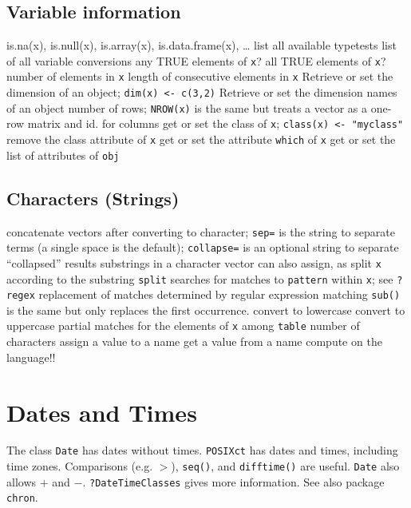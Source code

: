 \subsection{Variable information}{is.na(x), is.null(x), is.array(x), is.data.frame(x), \ldots}
	{list all available typetests}
	{list of all variable conversions}
	{any TRUE elements of {\tt x}?}
	{all TRUE elements of {\tt x}?}
	{ number of elements in {\tt x}}
	{length of consecutive elements in {\tt x}}
	{Retrieve or set the dimension of an object; {\tt dim(x) <- c(3,2)}}
	{Retrieve or set the dimension names of an object}
	{number of rows; {\tt NROW(x)} is the same but treats a vector as a one-row matrix}
	{and}
	{id. for columns}
	{get or set the class of {\tt x}; {\tt class(x) <- "myclass"}}
	{remove the class attribute of {\tt x}}
	{get or set the attribute {\tt which} of {\tt x}}
	{get or set the list of attributes of {\tt obj}}

\subsection{Characters (Strings)}{}
	{concatenate vectors after converting to character; {\tt sep=} is the string to separate terms (a single space is the default); {\tt collapse=} is an optional string to separate ``collapsed'' results}
	{substrings in a character vector}
	{can also assign, as}
	{split {\tt x} according to the substring {\tt split}}
	{searches for matches to {\tt pattern} within {\tt x}; see {\tt ?regex}}
	{replacement of matches determined by regular expression matching {\tt sub()} is the same but only replaces the first occurrence.}
	{convert to lowercase}
	{convert to uppercase}
	{partial matches for the elements of {\tt x} among {\tt table}}
	{number of characters}
	{assign a value to a name}
	{get a value from a name}
	{compute on the language!!}

\section{Dates and Times}{
The class {\tt Date} has dates without times.  {\tt POSIXct} has
dates and times, including time zones. Comparisons (e.g. $>$),
{\tt seq()}, and {\tt difftime()} are useful. {\tt Date} also allows
$+$ and $-$. {\tt ?DateTimeClasses} gives more information. See also package
{\tt chron}.}

